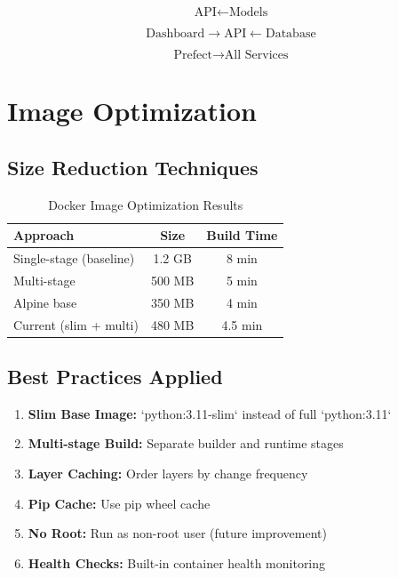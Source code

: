 \begin{equation}
\text{API} \leftarrow \text{Models}
\end{equation}

\begin{equation}
\text{Dashboard} \rightarrow \text{API} \leftarrow \text{Database}
\end{equation}

\begin{equation}
\text{Prefect} \rightarrow \text{All Services}
\end{equation}

\section{Image Optimization}

\subsection{Size Reduction Techniques}

\begin{table}[H]
\centering
\caption{Docker Image Optimization Results}
\begin{tabularx}{\textwidth}{lcc}
\toprule
\textbf{Approach} & \textbf{Size} & \textbf{Build Time} \\
\midrule
Single-stage (baseline) & 1.2 GB & 8 min \\
Multi-stage & 500 MB & 5 min \\
Alpine base & 350 MB & 4 min \\
Current (slim + multi) & 480 MB & 4.5 min \\
\bottomrule
\end{tabularx}
\end{table}

\subsection{Best Practices Applied}

\begin{enumerate}
    \item \textbf{Slim Base Image:} `python:3.11-slim` instead of full `python:3.11`
    \item \textbf{Multi-stage Build:} Separate builder and runtime stages
    \item \textbf{Layer Caching:} Order layers by change frequency
    \item \textbf{Pip Cache:} Use pip wheel cache
    \item \textbf{No Root:} Run as non-root user (future improvement)
    \item \textbf{Health Checks:} Built-in container health monitoring
\end{enumerate}

